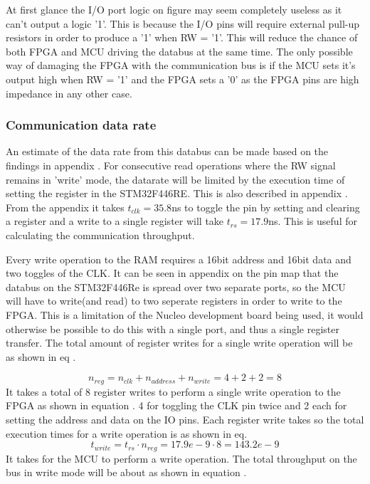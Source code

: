 At first glance the I/O port logic on figure  may seem completely useless as it can't output a logic '1'. This is because the I/O pins will require external pull-up resistors in order to produce a '1' when RW = '1'. This will reduce the chance of both FPGA and MCU driving the databus at the same time. The only possible way of damaging the FPGA with the communication bus is if the MCU sets it's output high when RW = '1' and the FPGA sets a '0' as the FPGA pins are high impedance in any other case.

\subsubsection{Communication data rate} \label{subsubsec:CommunicationDatarate}

An estimate of the data rate from this databus can be made based on the findings in appendix . For consecutive read operations where the RW signal remains in 'write' mode, the datarate will be limited by the execution time of setting the register in the STM32F446RE. This is also described in appendix . From the appendix it takes $t_{clk} = 35.8$ns to toggle the pin by setting and clearing a register and a write to a single register will take $t_{rs} = 17.9$ns. This is useful for calculating the communication throughput.

Every write operation to the RAM requires a 16bit address and 16bit data and two toggles of the CLK. It can be seen in appendix  on the pin map that the databus on the STM32F446Re is spread over two separate ports, so the MCU will have to write(and read) to two seperate registers in order to write to the FPGA. This is a limitation of the Nucleo development board being used, it would otherwise be possible to do this with a single port, and thus a single register transfer. The total amount of register writes for a single write operation will be as shown in eq .

\begin{equation}\label{eq:7_2_1_Write_ThroughPut}
    n_{reg} = n_{clk} +  n_{address} + n_{write} = 4+2+2 = 8 
\end{equation}
It takes a total of 8 register writes to perform a single write operation to the FPGA as shown in equation . 4 for toggling the CLK pin twice and 2 each for setting the address and data on the IO pins. Each register write takes  so the total execution times for a write operation is  as shown in eq.
\begin{equation}\label{eq:7_2_1_Write_ThroughPutTotalTime}
    t_{write} = t_{rs} \cdot n_{reg} = 17.9e-9 \cdot 8 =  143.2e-9
\end{equation}
It takes  for the MCU to perform a write operation. The total throughput on the bus in write mode will be about  as shown in equation .


